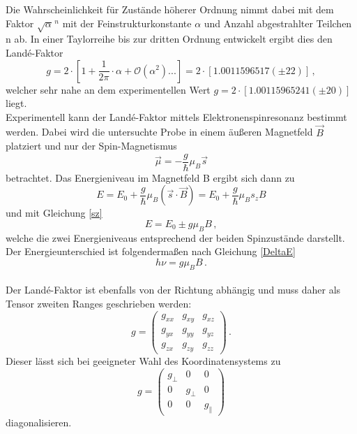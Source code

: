 \documentclass{scrartcl}
\begin{document}
Die Wahrscheinlichkeit für Zustände höherer Ordnung nimmt dabei mit dem Faktor $\sqrt{\alpha}^{\, n}$ mit der Feinstrukturkonstante $\alpha$ und Anzahl abgestrahlter Teilchen n ab. In einer Taylorreihe bis zur dritten Ordnung entwickelt ergibt dies den Landé-Faktor 
\begin{equation}
    g=2\cdot[1+\frac{1}{2\pi}\cdot\alpha+\mathcal O(\alpha^{2})...]=2\cdot[1.0011596517(\pm22)]\,,
\end{equation}
welcher sehr nahe an dem experimentellen Wert $g=2\cdot[1.00115965241(\pm20)]$ liegt.\\
Experimentell kann der Landé-Faktor mittels Elektronenspinresonanz bestimmt werden. 
Dabei wird die untersuchte Probe in einem äußeren Magnetfeld $\Vec{B}$ platziert und nur der Spin-Magnetismus
\begin{equation}
    \Vec{\mu}=-\frac{g}{\hbar}\mu_{B}\Vec{s}
\end{equation}
betrachtet. Das Energieniveau im Magnetfeld B ergibt sich dann zu 
\begin{equation}
    E=E_{0}+\frac{g}{\hbar}\mu_{B}(\Vec{s}\cdot\Vec{B})=E_{0}+\frac{g}{\hbar}\mu_{B}s_{z}B
\end{equation}
und mit Gleichung \ref{sz}
\begin{equation}
    E=E_{0}\pm g\mu_{B}B\,,
\end{equation}
welche die zwei Energieniveaus entsprechend der beiden Spinzustände darstellt. Der Energieunterschied ist folgendermaßen nach Gleichung \ref{DeltaE} 
\begin{equation}
    \label{hnu}
    h \nu =g\mu_{B}B\,.
\end{equation}\\
Der Landé-Faktor ist ebenfalls von der Richtung abhängig und muss daher als Tensor zweiten Ranges geschrieben werden:
\begin{equation}
g=
    \begin{pmatrix}
g_{xx} & g_{xy} & g_{xz}\\
g_{yx} & g_{yy} & g_{yz}\\
g_{zx} & g_{zy} & g_{zz}
\end{pmatrix}\,.
\end{equation}
Dieser lässt sich bei geeigneter Wahl des Koordinatensystems zu 
\begin{equation}
g=
    \begin{pmatrix}
g_{\perp} & 0 &0\\
0 & g_{\perp} & 0\\
0 & 0 & g_{\parallel}
\end{pmatrix}
\end{equation}
diagonalisieren. 
\end{document}
